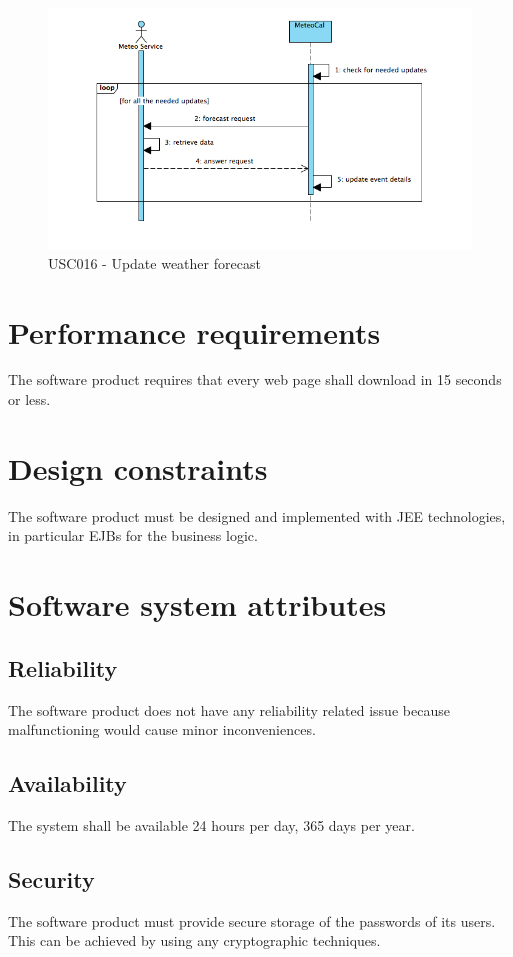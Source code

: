 \documentclass[10pt,a4paper,titlepage]{article}
\begin{document}
\begin{figure}[h]
\centering
\includegraphics[width=\linewidth]{./Sequence_diag/USC016.png}
\caption[USC016]{USC016 - Update weather forecast}
\label{fig:USC016}
\end{figure}

\section{Performance requirements}
The software product requires that every web page shall download in 15 seconds or less.

\section{Design constraints}
The software product must be designed and implemented with JEE technologies, in particular
EJBs for the business logic.

\section{Software system attributes}

\subsection{Reliability}
The software product does not have any reliability related issue because malfunctioning would cause minor inconveniences.

\subsection{Availability}
The system shall be available 24 hours per day, 365 days per year.

\subsection{Security}
The software product must provide secure storage of the passwords of its users. This can be
achieved by using any cryptographic techniques.
\end{document}
